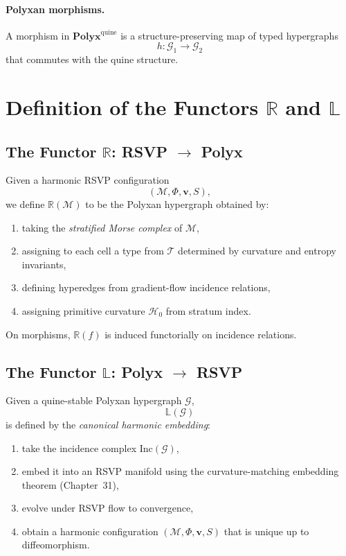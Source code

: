 \paragraph{Polyxan morphisms.}
A morphism in $\mathbf{Polyx}^{\mathrm{quine}}$ is a structure-preserving map
of typed hypergraphs
\[
h : \mathcal{G}_1 \to \mathcal{G}_2
\]
that commutes with the quine structure.



\section{Definition of the Functors \texorpdfstring{$\mathbb{R}$}{R} and \texorpdfstring{$\mathbb{L}$}{L}}

\subsection{The Functor \texorpdfstring{$\mathbb{R}$}{R}: RSVP $\to$ Polyx}

Given a harmonic RSVP configuration
\[
(\mathcal{M},\Phi,\mathbf{v},S),
\]
we define $\mathbb{R}(\mathcal{M})$ to be the Polyxan hypergraph obtained by:

\begin{enumerate}
\item taking the \emph{stratified Morse complex} of $\mathcal{M}$,
\item assigning to each cell a type from $\mathscr{T}$ determined by curvature
  and entropy invariants,
\item defining hyperedges from gradient-flow incidence relations,
\item assigning primitive curvature $\mathcal{H}_0$ from stratum index.
\end{enumerate}

On morphisms, $\mathbb{R}(f)$ is induced functorially on incidence relations.

\subsection{The Functor \texorpdfstring{$\mathbb{L}$}{L}: Polyx $\to$ RSVP}

Given a quine-stable Polyxan hypergraph $\mathcal{G}$,
\[
\mathbb{L}(\mathcal{G})
\]
is defined by the \emph{canonical harmonic embedding}:

\begin{enumerate}
\item take the incidence complex $\mathrm{Inc}(\mathcal{G})$,
\item embed it into an RSVP manifold using the curvature-matching embedding
  theorem (Chapter~31),
\item evolve under RSVP flow to convergence,
\item obtain a harmonic configuration $(\mathcal{M},\Phi,\mathbf{v},S)$ that is
  unique up to diffeomorphism.
\end{enumerate}




